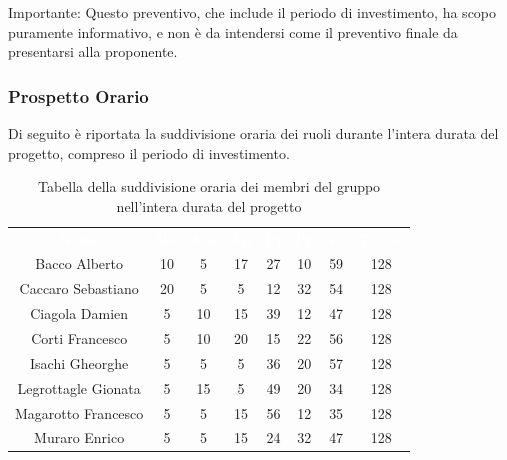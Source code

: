 Importante: Questo preventivo, che include il periodo di investimento, ha scopo puramente informativo, e non è da intendersi come il preventivo finale da presentarsi alla proponente.
\subsubsection{Prospetto Orario}
Di seguito è riportata la suddivisione oraria dei ruoli durante l'intera durata del progetto, compreso il periodo di investimento.




\begin{table}[H]	
	\begin{center}
	    \begin{tabular}{cccccccc}
			\rowcolor{greySWEight}
			\textcolor{white}{\textbf{Nome}} & \textcolor{white}{\textbf{Re}} & \textcolor{white}{\textbf{Am}} & \textcolor{white}{\textbf{An}} & \textcolor{white}{\textbf{Pj}} & \textcolor{white}{\textbf{Pr}} & \textcolor{white}{\textbf{Ve}} & \textcolor{white}{\textbf{Totale}}
			\\
			Bacco Alberto & 10 & 5 & 17 & 27 & 10 & 59 & 128 \\
			Caccaro Sebastiano & 20 & 5 & 5 & 12 & 32 & 54 & 128 \\
			Ciagola Damien & 5 & 10 & 15 & 39 & 12 & 47 & 128 \\
			Corti Francesco & 5 & 10 & 20 & 15 & 22 & 56 & 128 \\
			Isachi Gheorghe & 5 & 5 & 5 & 36 & 20 & 57 & 128 \\
			Legrottagle Gionata & 5 & 15 & 5 & 49 & 20 & 34 & 128 \\
			Magarotto Francesco & 5 & 5 & 15 & 56 & 12 & 35 & 128 \\
			Muraro Enrico & 5 & 5 & 15 & 24 & 32 & 47 & 128 \\
			\end{tabular}
	    \caption{Tabella della suddivisione oraria dei membri del gruppo nell'intera durata del progetto} \label{tab:tabellaProgInt} 
	\end{center}
\end{table}

